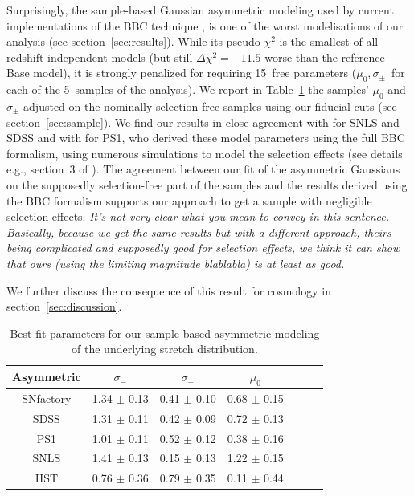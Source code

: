 \documentclass[]{aa} %
\newcommand{\nn}[1]{{\textcolor[rgb]{0.25, 0.50, 0}{#1}}}
\newcommand{\yc}[1]{{\textcolor{BrickRed}{#1}}}
\begin{document}
Surprisingly, the sample-based Gaussian asymmetric modeling used by current
implementations of the BBC technique \citep{scolnic2016, kessler2017}, is one of
the worst modelisations of our analysis (see section~\ref{sec:results}). While
its pseudo-$\chi^{2}$ is the smallest of all redshift-independent models (but
still $\Delta\chi^2 = -11.5$ worse than the reference Base model), it is
strongly penalized for requiring 15~free parameters ($\mu_0, \sigma_{\pm}$~for
each of the 5~samples of the analysis). We report in Table~\ref{tab:bbc} the
samples' $\mu_0$ and $\sigma_{\pm}$ adjusted on the \nn{nominally}
selection-free samples using our fiducial cuts (see section~\ref{sec:sample}).
We find our results in close agreement with \cite{scolnic2016} for SNLS and SDSS
and with \cite{scolnic2018a} for PS1, who derived these model parameters using
the full BBC formalism, using numerous simulations to model the selection
effects (see details e.g., section~3 of \citealt{kessler2017}). The agreement
between our fit of the asymmetric Gaussians on the supposedly selection-free
part of the samples and the results derived using the BBC formalism supports our
approach to get a sample with negligible selection effects. \yc{\textit{It's not
very clear what you mean to convey in this sentence.}} \nn{\textit{Basically,
because we get the same results but with a different approach, theirs being
complicated and supposedly good for selection effects, we think it can show that
ours (using the limiting magnitude blablabla) is at least as good.}}

We further discuss the consequence of this result for cosmology in
section~\ref{sec:discussion}.
    
\begin{table}
    \centering
    \caption{Best-fit parameters for our sample-based asymmetric modeling of the
    underlying stretch distribution.}
    \label{tab:bbc}
    \begin{tabular}{ccccccc}
    \hline\hline
    Asymmetric & $\sigma_{-}$    & $\sigma_{+}$    & $\mu_0$ \\
    \hline
    SNfactory  & 1.34 $\pm$ 0.13 & 0.41 $\pm$ 0.10 & 0.68 $\pm$ 0.15 \\
    SDSS       & 1.31 $\pm$ 0.11 & 0.42 $\pm$ 0.09 & 0.72 $\pm$ 0.13 \\
    PS1        & 1.01 $\pm$ 0.11 & 0.52 $\pm$ 0.12 & 0.38 $\pm$ 0.16 \\
    SNLS       & 1.41 $\pm$ 0.13 & 0.15 $\pm$ 0.13 & 1.22 $\pm$ 0.15 \\
    HST        & 0.76 $\pm$ 0.36 & 0.79 $\pm$ 0.35 & 0.11 $\pm$ 0.44 \\
    \hline
    \end{tabular}
\end{table}
    
\end{document}

